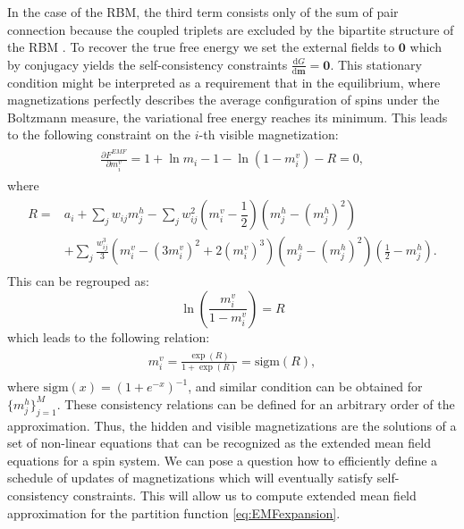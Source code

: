 In the case of the RBM, the third term consists only of the sum of pair connection because the coupled triplets are excluded by the bipartite structure of the RBM \cite{gabrie2015training}. To recover the true free energy we set the external fields to $\mathbf{0}$ which by conjugacy yields the self-consistency constraints $\frac{\text{d}G}{\text{d} \mathbf{m}} = \mathbf{0}$.
This stationary condition might be interpreted as a requirement that in the equilibrium, where magnetizations perfectly describes the average configuration of spins under the Boltzmann measure, the variational free energy reaches its minimum. This leads to the following constraint on the $i$-th visible magnetization:
\begin{align}
\begin{split}
 \frac{\partial F^{EMF
}}{\partial m_i^v} = 1 + \ln m_i - 1 - \ln (1 - m_i^v) -R =  0,
\end{split}
\end{align}
where 
\begin{align}
\begin{split}
R = & a_i + \sum_j w_{ij}m_j^h - \sum_j w_{ij}^2 \left( m_i^v - \dfrac{1}{2}\right) \left(m_j^h - (m_j^h)^2\right) \\
& + \sum_j \frac{w_{ij}^3}{3}\left( m_i^v - (3m_i^v)^2 + 2 (m_i^v)^3\right) (m_j^h - (m_j^h)^2)(\frac{1}{2} - m_j^h) .
\end{split}
\end{align}
This can be regrouped as:
$$ \ln \left(\frac{m_i^v}{1 - m_i^v} \right) = R $$
which leads to the following relation:
\begin{align}
\begin{split} m_i^v = \frac{\exp(R)}{1 + \exp(R)} = \text{sigm}(R),
\end{split}
\label{eq:selfConst}
\end{align}
where $\text{sigm}(x) = (1 + e^{-x})^{-1}$, and similar condition can be obtained for $ \{ m_j^h \}_{j=1}^M$. These consistency relations can be defined for an arbitrary order of the approximation. Thus, the hidden and visible magnetizations are the solutions of a set of non-linear equations that can be recognized as the extended mean field equations for a spin system. We can pose a question how to efficiently define a schedule of updates of magnetizations which will eventually satisfy self-consistency constraints. This will allow us to compute extended mean field approximation for the partition function \ref{eq:EMFexpansion}.

